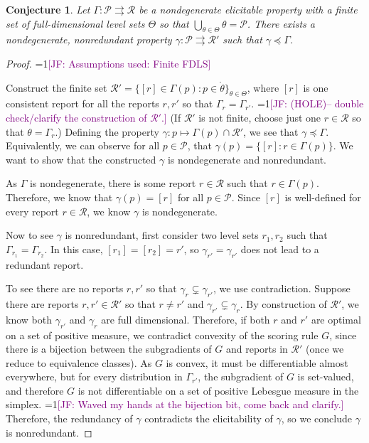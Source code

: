\documentclass[12pt]{article}
\newcommand{\Comments}{1}
\newcommand{\mynote}[2]{\ifnum\Comments=1\textcolor{#1}{#2}\fi}
\newcommand{\jessie}[1]{\mynote{purple}{[JF: #1]}}
\renewcommand{\P}{\mathcal{P}}
\newcommand{\R}{\mathcal{R}}
\newcommand{\inter}[1]{\mathring{#1}}%
\newcommand{\toto}{\rightrightarrows}
\newtheorem{conjecture}{Conjecture}
\begin{document}
\begin{conjecture}\label{conj:gam-prime-exists}
	Let $\Gamma:\P \toto \R$ be a nondegenerate elicitable property with a finite set of full-dimensional level sets $\Theta$ so that $\bigcup_{\theta \in \Theta}\theta = \P$.
	There exists a nondegenerate, nonredundant property $\gamma: \P \toto \R'$ such that $\gamma \preceq \Gamma$. 
\end{conjecture}
\begin{proof}
\jessie{Assumptions used: Finite FDLS}

	
	Construct the finite set $\R' = \{[r] \in \Gamma(p) : p \in \inter{\theta} \}_{\theta \in \Theta}$, where $[r]$ is one consistent report for all the reports $r, r'$ so that $\Gamma_r = \Gamma_{r'}$. 
	\jessie{(HOLE)-- double check/clarify the construction of $\R'$.}
	(If $\R'$ is not finite, choose just one $r \in \R$ so that $\theta = \Gamma_r$.)
	Defining the property $\gamma : p \mapsto \Gamma(p) \cap \R'$, we see that $\gamma \preceq \Gamma$.
	Equivalently, we can observe for all $p \in \P$, that $\gamma(p) = \{ [r] : r \in \Gamma(p) \}$.
	We want to show that the constructed $\gamma$ is nondegenerate and nonredundant.

	As $\Gamma$ is nondegenerate, there is some report $r \in \R$ such that $r \in \Gamma(p)$.
	Therefore, we know that $\gamma(p) = [r]$ for all $p\in \P$.
	Since $[r]$ is well-defined for every report $r \in \R$, we know $\gamma$ is nondegenerate.

	Now to see $\gamma$ is nonredundant, first consider two level sets $r_1, r_2$ such that $\Gamma_{r_1} = \Gamma_{r_2}$.
	In this case, $[r_1] = [r_2] = r'$, so $\gamma_{r'} = \gamma_{r'}$ does not lead to a redundant report.
	
	To see there are no reports $r, r'$ so that $\gamma_{r} \subsetneq \gamma_{r'}$, we use contradiction.
	Suppose there are reports $r, r' \in \R'$ so that $r \neq r'$ and $\gamma_{r'} \subsetneq \gamma_{r}$.
	By construction of $\R'$, we know both $\gamma_{r'}$ and $\gamma_r$ are full dimensional.
	Therefore, if both $r$ and $r'$ are optimal on a set of positive measure, we contradict convexity of the scoring rule $G$, since there is a bijection between the subgradients of $G$ and reports in $\R'$ (once we reduce to equivalence classes).
	As $G$ is convex, it must be differentiable almost everywhere, but for every distribution in $\Gamma_{r'}$, the subgradient of $G$ is set-valued, and therefore $G$ is not differentiable on a set of positive Lebesgue measure in the simplex. \jessie{Waved my hands at the bijection bit, come back and clarify.}
	Therefore, the redundancy of $\gamma$ contradicts the elicitability of $\gamma$, so we conclude $\gamma$ is nonredundant. 


\end{proof}
\end{document}
